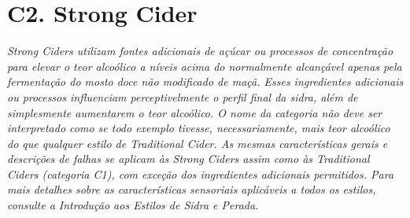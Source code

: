 \section*{C2. Strong Cider}
\textit{Strong Ciders utilizam fontes adicionais de açúcar ou processos de concentração para elevar o teor alcoólico a níveis acima do normalmente alcançável apenas pela fermentação do mosto doce não modificado de maçã. Esses ingredientes adicionais ou processos influenciam perceptivelmente o perfil final da sidra, além de simplesmente aumentarem o teor alcoólico. O nome da categoria não deve ser interpretado como se todo exemplo tivesse, necessariamente, mais teor alcoólico do que qualquer estilo de Traditional Cider. As mesmas características gerais e descrições de falhas se aplicam às Strong Ciders assim como às Traditional Ciders (categoria C1), com exceção dos ingredientes adicionais permitidos. Para mais detalhes sobre as características sensoriais aplicáveis a todos os estilos, consulte a Introdução aos Estilos de Sidra e Perada.}
